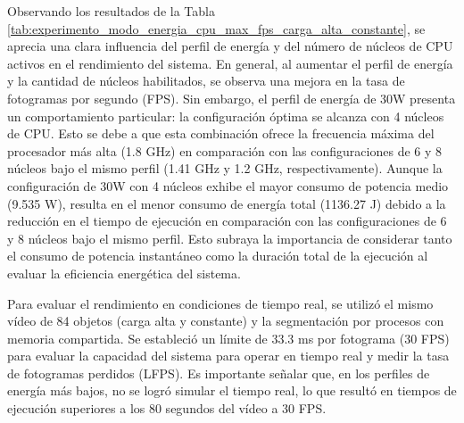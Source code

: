 \documentclass[11pt,spanish,listoffigures,listoftables]{tfgetsinf}
\begin{document}
   Observando los resultados de la Tabla \ref{tab:experimento_modo_energia_cpu_max_fps_carga_alta_constante}, se aprecia una clara influencia del perfil de energía y del número de núcleos de CPU activos en el rendimiento del sistema. En general, al aumentar el perfil de energía y la cantidad de núcleos habilitados, se observa una mejora en la tasa de fotogramas por segundo (FPS). Sin embargo, el perfil de energía de 30W presenta un comportamiento particular: la configuración óptima se alcanza con 4 núcleos de CPU. Esto se debe a que esta combinación ofrece la frecuencia máxima del procesador más alta (1.8 GHz) en comparación con las configuraciones de 6 y 8 núcleos bajo el mismo perfil (1.41 GHz y 1.2 GHz, respectivamente). Aunque la configuración de 30W con 4 núcleos exhibe el mayor consumo de potencia medio (9.535 W), resulta en el menor consumo de energía total (1136.27 J) debido a la reducción en el tiempo de ejecución en comparación con las configuraciones de 6 y 8 núcleos bajo el mismo perfil. Esto subraya la importancia de considerar tanto el consumo de potencia instantáneo como la duración total de la ejecución al evaluar la eficiencia energética del sistema.

   Para evaluar el rendimiento en condiciones de tiempo real, se utilizó el mismo vídeo de 84 objetos (carga alta y constante) y la segmentación por procesos con memoria compartida. Se estableció un límite de 33.3 ms por fotograma (30 FPS) para evaluar la capacidad del sistema para operar en tiempo real y medir la tasa de fotogramas perdidos (LFPS). Es importante señalar que, en los perfiles de energía más bajos, no se logró simular el tiempo real, lo que resultó en tiempos de ejecución superiores a los 80 segundos del vídeo a 30 FPS.
\end{document}

